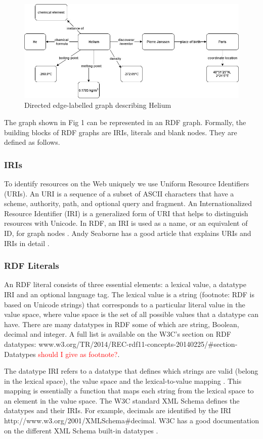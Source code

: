 \documentclass[12 pt, a4paper]{report}
\theoremstyle{definition}
\begin{document}
\begin{figure}[t]
  \centering
  \includegraphics[width=0.75 \linewidth]{images/del_graph.jpg}
  \caption{Directed edge-labelled graph describing Helium}
  \label{fig:figure 1}
\end{figure}

The graph shown in Fig 1 can be represented in an RDF graph. Formally, the building blocks of RDF graphs are IRIs, literals and blank nodes. They are defined as follows.

\subsubsection{IRIs}
To identify resources on the Web uniquely we use Uniform Resource Identifiers (URIs). An URI is a sequence of a subset of ASCII characters that have a scheme, authority, path, and optional query and fragment. An Internationalized Resource Identifier (IRI) is a generalized form of URI that helps to distinguish resources with Unicode. In RDF, an IRI is used as a name, or an equivalent of ID, for graph nodes \cite{Tehnologies2022}. Andy Seaborne has a good article that explains URIs and IRIs in detail \cite{Seaborne2020}.

\subsubsection{RDF Literals}

An RDF literal consists of three essential elements: a lexical value, a datatype IRI and an optional language tag. The lexical value is a string (footnote: RDF is based on Unicode strings) that corresponds to a particular literal value in the value space, where value space is the set of all possible values that a datatype can have. There are many datatypes in RDF some of which are string, Boolean, decimal and integer. A full list is available on the W3C's section on RDF datatypes: www.w3.org/TR/2014/REC-rdf11-concepts-20140225/\#section-Datatypes \textcolor{red}{should I give as footnote?}.

The datatype IRI refers to a datatype that defines which strings are valid (belong in the lexical space), the value space and the lexical-to-value mapping \cite{ Bonduel2019}. This mapping is essentially a function that maps each string from the lexical space to an element in the value space. The W3C  standard XML Schema defines the datatypes and their IRIs. For example, decimals are identified by the IRI http://www.w3.org/2001/XMLSchema\#decimal. W3C has a good documentation on the different XML Schema built-in datatypes \cite{ R.Cyganiak2014}.
\end{document}
